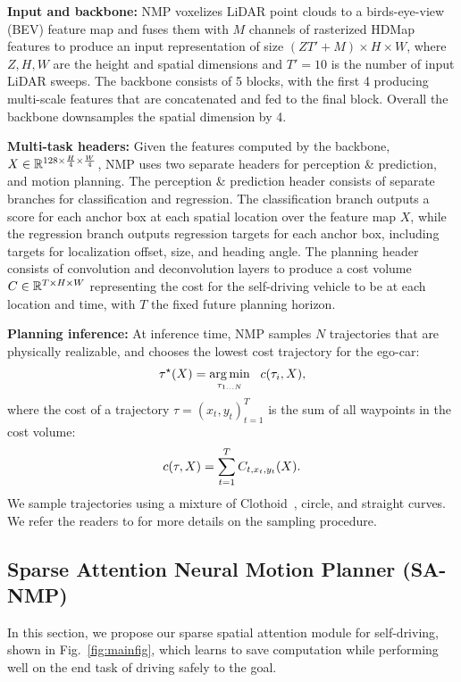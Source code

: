 \textbf{Input and backbone:} NMP voxelizes LiDAR point clouds to a birds-eye-view (BEV) feature map and fuses them with $M$ channels of rasterized HDMap features to produce an input representation of size $(ZT'+M)\times H\times W$, where $Z,H,W$ are the height and spatial dimensions and $T'=10$ is the number of input LiDAR sweeps. The backbone consists of 5 blocks, with the first 4 producing multi-scale features that are concatenated and fed to the final block. Overall the backbone downsamples the spatial dimension by 4.

\textbf{Multi-task headers:}
Given the features computed by the backbone, $X \in \mathbb{R}^{128\times \frac{H}{4} \times \frac{W}{4}}$, NMP uses two separate headers for perception \& prediction, and motion planning.
 The perception \& prediction header consists of separate branches for classification and regression. The classification branch outputs a score for each anchor box at each spatial location over the feature map $X$, while the regression branch outputs regression targets for each anchor box, including targets for localization offset, size, and heading angle.
The planning header consists of convolution and deconvolution layers to produce a cost volume $ C \in \mathbb{R}^{T \times H \times W}$ representing the cost for the self-driving vehicle to be at each location and time, with $T$ the fixed future planning horizon.

\textbf{Planning inference:}
At inference time, NMP samples $N$ trajectories  that are physically realizable, and chooses the lowest cost trajectory for the ego-car:
\vskip -0.15in
\begin{align}
\tau^\star(X) = \operatorname*{arg\,min}_{\tau_{1 \dots N}} \ \ c(\tau_i, X),
\end{align}
where the cost of a
trajectory $\tau = (x_t, y_t)_{t=1}^{T}$ is the sum of all waypoints in the cost volume:
\vskip -0.15in
\begin{align}
c(\tau, X) = \sum_{t=1}^T C_{t, x_t, y_t}(X).
\end{align}
We sample trajectories using a mixture of Clothoid~\cite{clothoid}, circle, and straight curves. We refer the readers to \cite{nmp} for more details on the sampling procedure.

\subsection{Sparse Attention Neural Motion Planner (SA-NMP)}
In this section, we propose our sparse spatial attention module for self-driving, shown in Fig.~\ref{fig:mainfig}, which learns to save computation while performing well on the end task of driving safely to the goal.

